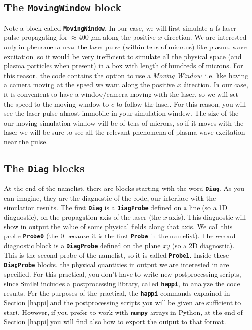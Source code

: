 \documentclass{article}
\newcommand{\smilei}{{\sc Smilei}\xspace}
\newcommand{\commandline}[1]{\texttt{\textbf{#1}}}
\begin{document}
\subsection*{The \commandline{MovingWindow} block}
Note a block called \commandline{MovingWindow}. In our case, we will first simulate a fs laser pulse  propagating for $\approx 400$ $\mu$m along the positive $x$ direction. We are interested only in phenomena near the laser pulse (within tens of microns) like plasma wave excitation, so it would be very inefficient to simulate all the physical space (and plasma particles when present) in a box with length of hundreds of microns. For this reason, the code contains the option to use a \emph{Moving} \emph{Window}, i.e. like having a camera moving at the speed we want  along the positive $x$ direction. In our case, it is convenient to have a window/camera moving with the laser, so we will set the speed to  the moving window to $c$ to follow the laser. For this reason, you will see the laser pulse almost immobile in your simulation window. The size of the our moving simulation window will be of tens of microns, so if it moves with the laser we will be sure to see all the relevant phenomena of plasma wave excitation near the pulse.

\subsection*{The \commandline{Diag} blocks}
At the end of the namelist, there are blocks starting with the word \commandline{Diag}. As you can imagine, they are the diagnostic of the code, our interface with the simulation results. The first \commandline{Diag} is a \commandline{DiagProbe} defined on a line (so a 1D diagnostic), on the propagation axis of the laser (the $x$ axis). This diagnostic will show in output the value of some physical fields along that axis. We call this probe \commandline{Probe0} (the 0 because it is the first \commandline{Probe} in the namelist). The second diagnostic block is a \commandline{DiagProbe} defined on the plane $xy$ (so a 2D diagnostic). This is the second probe of the namelist, so it is called \commandline{Probe1}. Inside these \commandline{DiagProbe} blocks, the physical quantities in output we are interested in are specified. For this practical, you don't have to write new postprocessing scripts, since \smilei includes a postprocessing library, called \commandline{happi}, to analyze the code results. For the purposes of the practical, the \commandline{happi} commands explained in Section \ref{happi} and the postprocessing scripts you will be given are sufficient to start. However, if you prefer to work with \commandline{numpy} arrays in Python, at the end of Section \ref{happi} you will find also how to export the output to that format.
\end{document}
